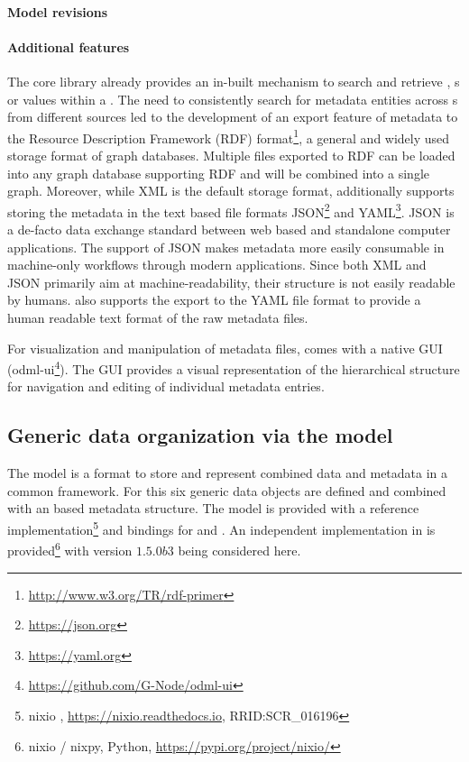 \paragraph{Model revisions}
\label{sec:odml_model_revision}

\paragraph{Additional features}
The  core library already provides an in-built mechanism to search and retrieve , s or values within a . The need to consistently search for metadata entities across s from different sources led to the development of an export feature of  metadata to the Resource Description Framework (RDF) format\footnote{\url{http://www.w3.org/TR/rdf-primer}}, a general and widely used storage format of graph databases. Multiple  files exported to RDF can be loaded into any graph database supporting RDF and will be combined into a single graph. Moreover, while XML is the default storage format,  additionally supports storing the metadata in the text based file formats JSON\footnote{\url{https://json.org}} and YAML\footnote{\url{https://yaml.org}}. JSON is a de-facto data exchange standard between web based and standalone computer applications. The support of JSON makes  metadata more easily consumable in machine-only workflows through modern applications. Since both XML and JSON primarily aim at machine-readability, their structure is not easily readable by humans.  also supports the export to the YAML file format to provide a human readable text format of the raw metadata files.

For visualization and manipulation of metadata files,  comes with a native  GUI (odml-ui\footnote{\url{https://github.com/G-Node/odml-ui}}). The GUI provides a visual representation of the hierarchical structure for navigation and editing of individual metadata entries.


\subsection{Generic data organization via the  model}
The  model is a format to store and represent combined data and metadata in a common framework. For this six generic data objects are defined and combined with an  based metadata structure. The  model is provided with a  reference implementation\footnote{nixio , \url{https://nixio.readthedocs.io},  RRID:SCR\_016196} and bindings for  and . An independent implementation in  is provided\footnote{nixio / nixpy, Python, \url{https://pypi.org/project/nixio/}} with version $1.5.0b3$ being considered here.

